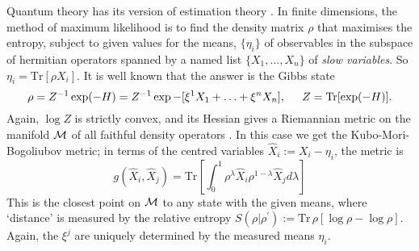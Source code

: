 Quantum theory has its version of estimation theory \cite{Holevo,Ohya}.
In finite dimensions, the method of maximum likelihood is to find the
density
matrix $\rho$ that maximises the entropy, subject to given values for
the means, $\{\eta_i\}$ of observables in the subspace of hermitian operators
spanned by a named list $\{X_1,\ldots,X_n\}$ of {\em slow variables}.
So $\eta_i=\mbox{Tr}[\rho X_i]$. It is well known
that the answer is the Gibbs state
\begin{equation}
\rho=Z^{-1}\exp(-H)=Z^{-1}\exp-[\xi^1X_1+\ldots+\xi^nX_n],\hspace{.2in}
Z=\mbox{Tr}[\exp(-H)].
\end{equation}
Again, $\log Z$ is strictly convex, and its Hessian gives a Riemannian
metric on the manifold ${\cal M}$ of all faithful density operators
\cite{Ingarden4,Chentsov,Petz2}. In this case we get the
Kubo-Mori-Bogoliubov metric; in terms of the centred variables
$\hat{X}_i:=X_i-\eta_i$,
the metric is
\begin{equation}
g(\hat{X}_i,\hat{X}_j)=\mbox{Tr}\left[\int_0^1\rho^\lambda\hat{X}_i\rho^
{1-\lambda}\hat{X}_jd\lambda\right]
\end{equation}
This is the closest point on ${\cal M}$ to any state with the given
means, where `distance' is measured by the relative entropy $S(\rho|
\rho^\prime):=\mbox{Tr}\,\rho[\log\rho-\log\rho]$.
Again, the $\xi^j$ are uniquely determined by
the measured means $\eta_i$.


\newpage

